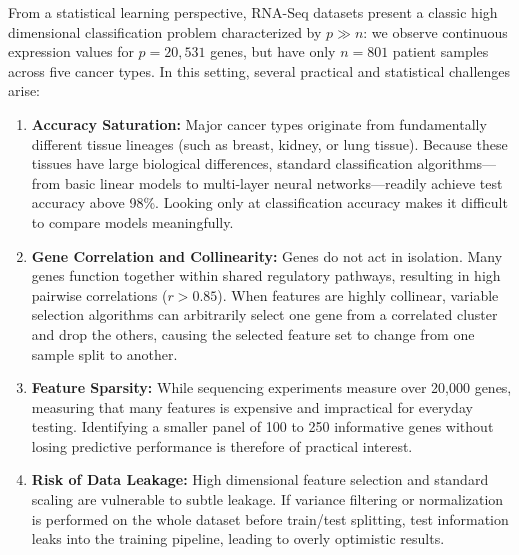 \documentclass[11pt,a4paper]{article}
\begin{document}
From a statistical learning perspective, RNA-Seq datasets present a classic high dimensional classification problem characterized by $p \gg n$: we observe continuous expression values for $p = 20{,}531$ genes, but have only $n = 801$ patient samples across five cancer types. In this setting, several practical and statistical challenges arise:
\begin{enumerate}
    \item \textbf{Accuracy Saturation:} Major cancer types originate from fundamentally different tissue lineages (such as breast, kidney, or lung tissue). Because these tissues have large biological differences, standard classification algorithms—from basic linear models to multi-layer neural networks—readily achieve test accuracy above 98\%. Looking only at classification accuracy makes it difficult to compare models meaningfully.
    \item \textbf{Gene Correlation and Collinearity:} Genes do not act in isolation. Many genes function together within shared regulatory pathways, resulting in high pairwise correlations ($r > 0.85$). When features are highly collinear, variable selection algorithms can arbitrarily select one gene from a correlated cluster and drop the others, causing the selected feature set to change from one sample split to another.
    \item \textbf{Feature Sparsity:} While sequencing experiments measure over 20,000 genes, measuring that many features is expensive and impractical for everyday testing. Identifying a smaller panel of 100 to 250 informative genes without losing predictive performance is therefore of practical interest.
    \item \textbf{Risk of Data Leakage:} High dimensional feature selection and standard scaling are vulnerable to subtle leakage. If variance filtering or normalization is performed on the whole dataset before train/test splitting, test information leaks into the training pipeline, leading to overly optimistic results.
\end{enumerate}
\end{document}
